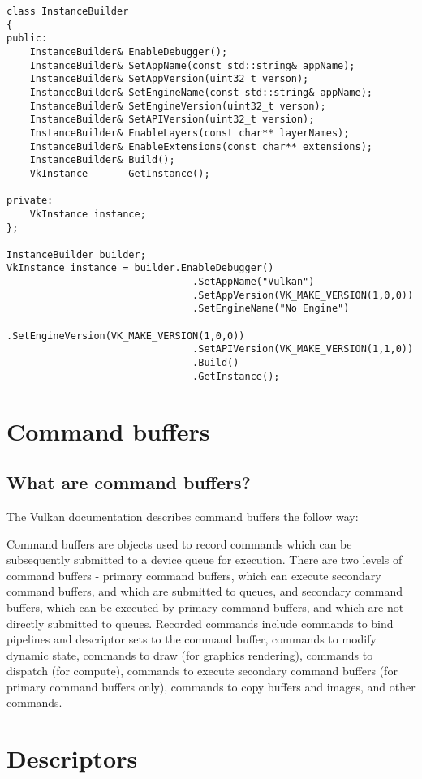 \documentclass[12pt]{article}
\begin{document}
	\begin{lstlisting}[style=customcpp]
class InstanceBuilder
{
public:
	InstanceBuilder& EnableDebugger();
	InstanceBuilder& SetAppName(const std::string& appName);
	InstanceBuilder& SetAppVersion(uint32_t verson);
	InstanceBuilder& SetEngineName(const std::string& appName);
	InstanceBuilder& SetEngineVersion(uint32_t verson);
	InstanceBuilder& SetAPIVersion(uint32_t version);
	InstanceBuilder& EnableLayers(const char** layerNames);
	InstanceBuilder& EnableExtensions(const char** extensions);
	InstanceBuilder& Build();
	VkInstance       GetInstance();

private:
	VkInstance instance;
};

InstanceBuilder builder;
VkInstance instance = builder.EnableDebugger()
								.SetAppName("Vulkan")
								.SetAppVersion(VK_MAKE_VERSION(1,0,0))
								.SetEngineName("No Engine")
								.SetEngineVersion(VK_MAKE_VERSION(1,0,0))
								.SetAPIVersion(VK_MAKE_VERSION(1,1,0))
								.Build()
								.GetInstance();
	\end{lstlisting}

	\section{Command buffers}
	\subsection{What are command buffers?}
	The Vulkan documentation describes command buffers the follow way:\newline

	Command buffers are objects used to record commands which can be subsequently submitted to a device queue for execution. There are two levels of command buffers - primary command buffers, which can execute secondary command buffers, and which are submitted to queues, and secondary command buffers, which can be executed by primary command buffers, and which are not directly submitted to queues. Recorded commands include commands to bind pipelines and descriptor sets to the command buffer, commands to modify dynamic state, commands to draw (for graphics rendering), commands to dispatch (for compute), commands to execute secondary command buffers (for primary command buffers only), commands to copy buffers and images, and other commands.

	\newpage
	\section{Descriptors}
\end{document}

